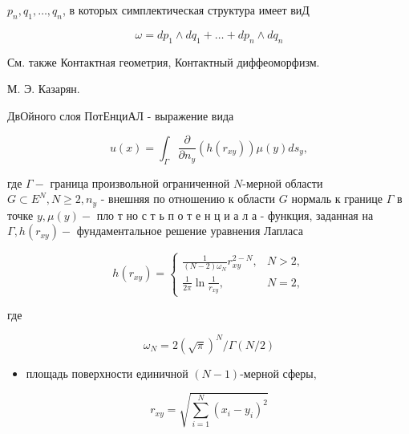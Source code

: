 \documentclass[10pt]{article}
\begin{document}
$p_{n}, q_{1}, \ldots, q_{n}$, в которых симплектическая структура имеет виД



\[

\omega=d p_{1} \wedge d q_{1}+\ldots+d p_{n} \wedge d q_{n}

\]



См. также Контактная геометрия, Контактный диффеоморфизм.



М. Э. Казарян.



ДвОйного слоя ПотЕнциАЛ - выражение вида



\[

u(x)=\int_{\Gamma} \frac{\partial}{\partial n_{y}}\left(h\left(r_{x y}\right)\right) \mu(y) d s_{y},

\]



где $\Gamma-$ граница произвольной ограниченной $N$-мерной области $G \subset E^{N}, N \geqslant 2, n_{y}$ - внешняя по отношению к области $G$ нормаль к границе $\Gamma$ в точке $y, \mu(y)-$ пло т но с т ь п о т е н ц и а л а - функция, заданная на $\Gamma, h\left(r_{x y}\right)-$ фундаментальное решение уравнения Лапласа



\[

h\left(r_{x y}\right)= \begin{cases}\frac{1}{(N-2) \omega_{N}} r_{x y}^{2-N}, & N>2, \\ \frac{1}{2 \pi} \ln \frac{1}{r_{x y}}, & N=2,\end{cases}

\]



где



\[

\omega_{N}=2(\sqrt{\pi})^{N} / \Gamma(N / 2)

\]



\begin{itemize}

  \item площадь поверхности единичной $(N-1)$-мерной сферы,

\end{itemize}



\[

r_{x y}=\sqrt{\sum_{i=1}^{N}\left(x_{i}-y_{i}\right)^{2}}

\]
\end{document}
